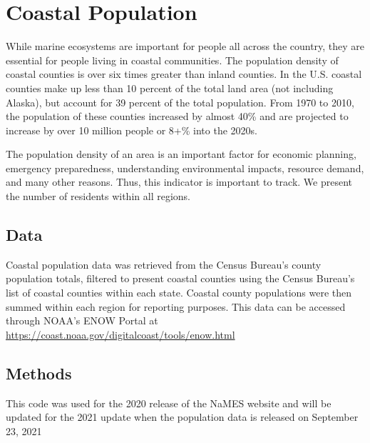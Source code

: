 \documentclass[
]{book}
\begin{document}
\hypertarget{coastal-population}{%
\chapter{Coastal Population}\label{coastal-population}}

While marine ecosystems are important for people all across the country, they are essential for people living in coastal communities. The population density of coastal counties is over six times greater than inland counties. In the U.S. coastal counties make up less than 10 percent of the total land area (not including Alaska), but account for 39 percent of the total population. From 1970 to 2010, the population of these counties increased by almost 40\% and are projected to increase by over 10 million people or 8+\% into the 2020s.

The population density of an area is an important factor for economic planning, emergency preparedness, understanding environmental impacts, resource demand, and many other reasons. Thus, this indicator is important to track. We present the number of residents within all regions.

\hypertarget{data-11}{%
\section{Data}\label{data-11}}

Coastal population data was retrieved from the Census Bureau's county population totals, filtered to present coastal counties using the Census Bureau's list of coastal counties within each state. Coastal county populations were then summed within each region for reporting purposes. This data can be accessed through NOAA's ENOW Portal at \url{https://coast.noaa.gov/digitalcoast/tools/enow.html}

\hypertarget{methods-11}{%
\section{Methods}\label{methods-11}}

This code was used for the 2020 release of the NaMES website and will be updated for the 2021 update when the population data is released on September 23, 2021
\end{document}
